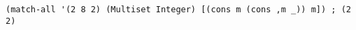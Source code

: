 \documentclass[acmlarge]{acmart}
\begin{document}
\begin{lstlisting}[language=egison]
(match-all '(2 8 2) (Multiset Integer) [(cons m (cons ,m _)) m]) ; (2 2)
\end{lstlisting}

\end{document}
